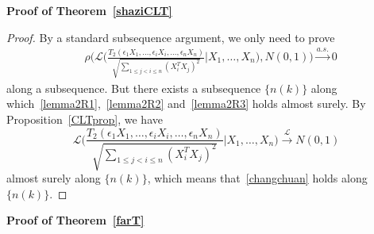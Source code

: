 \documentclass[review]{elsarticle}
\theoremstyle{plain}
\theoremstyle{definition}
\theoremstyle{remark}
\begin{document}
\textbf{Proof of Theorem~\ref{shaziCLT}}

\begin{proof}
By a standard subsequence argument, we only need to prove 
    \begin{equation}\label{changchuan}
        \begin{aligned}
            &\rho\Big(\mathcal{L}\Big(\frac{T_2(\epsilon_1 X_1,\ldots, \epsilon_i X_i,\ldots,\epsilon_n X_n)}{\sqrt{\sum_{1\leq j<i\leq n}{(X_i^T X_j)}^2}}\Big|X_1,\ldots,X_n\Big),N(0,1)\Big)
            \xrightarrow{a.s.} 0
        \end{aligned}
    \end{equation}
     along a subsequence.
    But there exists a subsequence $\{n(k)\}$ along which~\eqref{lemma2R1},~\eqref{lemma2R2} and~\eqref{lemma2R3} holds almost surely.
    By Proposition~\ref{CLTprop}, we have
    \begin{equation*}
        \mathcal{L}\Big(\frac{T_2(\epsilon_1 X_1,\ldots, \epsilon_i X_i,\ldots,\epsilon_n X_n)}{\sqrt{\sum_{1\leq j<i\leq n}{(X_i^T X_j)}^2}}\Big|X_1,\ldots,X_n\Big)\xrightarrow{\mathcal{L}}N(0,1)
    \end{equation*}
    almost surely along $\{n(k)\}$, which means that~\eqref{changchuan} holds along $\{n(k)\}$.

\end{proof}


\textbf{Proof of Theorem~\ref{farT}}
\end{document}
